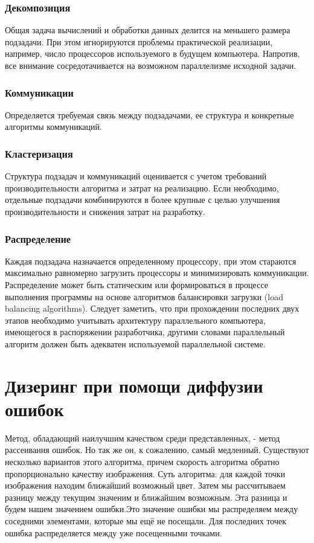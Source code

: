 \subsubsection{Декомпозиция} 
Общая задача вычислений и обработки данных делится на меньшего размера подзадачи. При этом игнорируются проблемы практической реализации, например, число процессоров используемого в будущем компьютера. Напротив, все внимание сосредотачивается на возможном параллелизме исходной задачи. 
\subsubsection{Коммуникации}
Определяется требуемая связь между подзадачами, ее структура и конкретные алгоритмы коммуникаций. 
\subsubsection{Кластеризация} 
Структура подзадач и коммуникаций оценивается с учетом требований производительности алгоритма и затрат на реализацию. Если необходимо, отдельные подзадачи комбинируются в более крупные с целью улучшения производительности и снижения затрат на разработку. 
\subsubsection{Распределение} 
Каждая подзадача назначается определенному процессору, при этом стараются максимально равномерно загрузить процессоры и минимизировать коммуникации. Распределение может быть статическим или формироваться в процессе выполнения программы на основе алгоритмов балансировки загрузки (load balancing algorithms). 
Следует заметить, что при прохождении последних двух этапов необходимо учитывать архитектуру параллельного компьютера, имеющегося в распоряжении разработчика, другими словами параллельный алгоритм должен быть адекватен используемой параллельной системе. 
\section{Дизеринг при помощи диффузии ошибок}
Метод, обладающий наилучшим качеством среди представленных, - метод рассеивания ошибок. Но так же он, к сожалению, самый медленный.\cite{Dh} Существуют несколько вариантов этого алгоритма, причем скорость алгоритма обратно пропорционально качеству изображения.\cite{Dh}
Суть алгоритма: для каждой точки изображения находим ближайший возможный цвет. Затем мы рассчитываем разницу между текущим значеним и ближайшим возможным. Эта разница и будем нашем значением ошибки.Это значение ошибки мы распределяем между соседними элементами, которые мы ещё не посещали. Для последних точек ошибка распределяется между уже посещенными точками.
